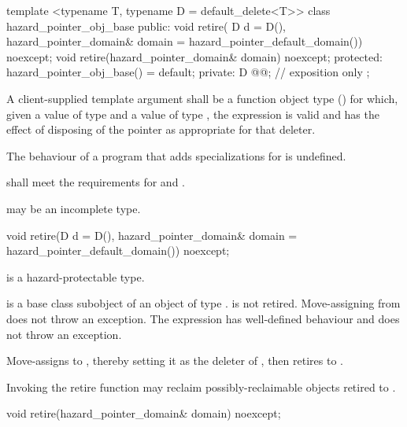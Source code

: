 \begin{codeblock}
template <typename T, typename D = default_delete<T>>
class hazard_pointer_obj_base {
public:
  void retire(
    D d = D(),
    hazard_pointer_domain& domain = hazard_pointer_default_domain()) noexcept;
  void retire(hazard_pointer_domain& domain) noexcept;
protected:
  hazard_pointer_obj_base() = default;
private:
  D @@; // exposition only
};
\end{codeblock}

\pnum
A client-supplied template argument  shall be a function object type ()
for which, given a value  of type  and a value  of type , the expression  is valid and has the effect of disposing of the pointer as appropriate for that deleter.

\pnum
The behaviour of a program that adds specializations for  is undefined.

\pnum
{} shall meet the requirements for  and .

\pnum
{} may be an incomplete type.

\begin{itemdecl}
void retire(D d = D(), hazard_pointer_domain& domain = hazard_pointer_default_domain()) noexcept;
\end{itemdecl}

\begin{itemdescr}

\pnum
\mandates
{} is a hazard-protectable type.

\pnum
\expects
{} is a base class subobject of an object  of type .  is not retired.
Move-assigning  from  does not throw an exception. The expression  has well-defined behaviour and does not throw an exception.

\pnum
\effects 
Move-assigns  to , thereby setting it as the deleter of , then retires 
to .

\pnum
Invoking the retire function may reclaim possibly-reclaimable objects retired to .

\end{itemdescr}

\begin{itemdecl}
void retire(hazard_pointer_domain& domain) noexcept;
\end{itemdecl}

